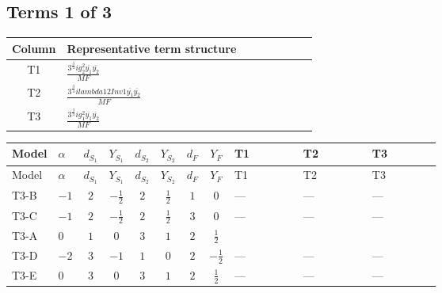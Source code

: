 \documentclass[8pt]{article}
\begin{document}
\begin{landscape}
\subsection*{Terms 1 of 3}
\begin{center}
\begin{tabular}{@{}c >{\raggedright\arraybackslash}p{0.82\linewidth}@{}}
\toprule
Column & Representative term structure \\
\midrule
T1 & \(\displaystyle \frac{3^{\frac{3}{4}} i g_{2}^{2} \overline{y_{1}} \overline{y_{2}}}{MF}\) \\
\midrule
T2 & \(\displaystyle \frac{3^{\frac{3}{4}} i lambda12Inv1 \overline{y_{1}} \overline{y_{2}}}{MF}\) \\
\midrule
T3 & \(\displaystyle \frac{3^{\frac{3}{4}} i g_{1}^{2} \overline{y_{1}} \overline{y_{2}}}{MF}\) \\
\midrule
\bottomrule
\end{tabular}
\end{center}
\smallskip
\tiny
\begin{longtable}{@{}llcccccc >{\raggedright\arraybackslash}p{0.21\linewidth} >{\raggedright\arraybackslash}p{0.21\linewidth} >{\raggedright\arraybackslash}p{0.21\linewidth}@{}}
\toprule
Model & $\alpha$ & $d_{S_1}$ & $Y_{S_1}$ & $d_{S_2}$ & $Y_{S_2}$ & $d_F$ & $Y_F$ & T1 & T2 & T3 \\
\midrule
\endfirsthead
\toprule
Model & $\alpha$ & $d_{S_1}$ & $Y_{S_1}$ & $d_{S_2}$ & $Y_{S_2}$ & $d_F$ & $Y_F$ & T1 & T2 & T3 \\
\midrule
\endhead
T3-B & $-1$ & $2$ & $-\frac{1}{2}$ & $2$ & $\frac{1}{2}$ & $1$ & $0$ & --- & --- & --- \\
\midrule
T3-C & $-1$ & $2$ & $-\frac{1}{2}$ & $2$ & $\frac{1}{2}$ & $3$ & $0$ & --- & --- & --- \\
\midrule
T3-A & $0$ & $1$ & $0$ & $3$ & $1$ & $2$ & $\frac{1}{2}$ & \scriptsize\adjustbox{max width=\linewidth}{$\begin{gathered} - \frac{11 \cdot 3^{\frac{3}{4}} i g_{2}^{2} \overline{y_{1}} \overline{y_{2}}}{8 MF}\end{gathered}$} & \scriptsize\adjustbox{max width=\linewidth}{$\begin{gathered} - \frac{3^{\frac{3}{4}} i lambda12Inv1 \overline{y_{1}} \overline{y_{2}}}{6 MF}\end{gathered}$} & \scriptsize\adjustbox{max width=\linewidth}{$\begin{gathered} - \frac{3^{\frac{3}{4}} i g_{1}^{2} \overline{y_{1}} \overline{y_{2}}}{8 MF}\end{gathered}$} \\
\midrule
T3-D & $-2$ & $3$ & $-1$ & $1$ & $0$ & $2$ & $-\frac{1}{2}$ & --- & --- & --- \\
\midrule
T3-E & $0$ & $3$ & $0$ & $3$ & $1$ & $2$ & $\frac{1}{2}$ & --- & --- & --- \\
\midrule
\bottomrule
\end{longtable}
\clearpage

\end{landscape}
\end{document}
